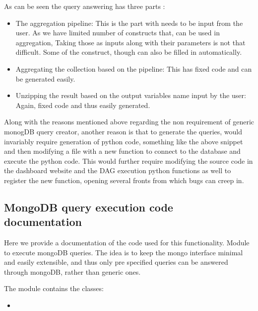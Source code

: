 \documentclass[letterpaper,10pt,english]{sphinxmanual}
\begin{document}
As can be seen the query answering has three parts :
\begin{itemize}
\item {} 
The aggregation pipeline: This is the part with needs to be input from the user. As we have limited number of constructs that, can be used in aggregation, Taking those as inputs along with their parameters is not that difficult. Some of the construct, though can also be filled in automatically.

\item {} 
Aggregating the collection based on the pipeline: This has fixed code and can be generated easily.

\item {} 
Unzipping the result based on the output variables name input by the user: Again, fixed code and thus easily generated.

\end{itemize}

Along with the reasons mentioned above regarding the non requirement of generic monogDB query creator, another reason is that to generate the queries, would invariably require generation of python code, something like the above snippet and then modifying a file with a new function to connect to the database and execute the python code. This would further require modifying the source code in the dashboard website and the DAG execution python functions as well to register the new function, opening several fronts from which bugs can creep in.


\subsection{MongoDB query execution code documentation}
\label{\detokenize{mongoDB_query_generation:mongodb-query-execution-code-documentation}}
Here we provide a documentation of the code used for this functionality.
\label{\detokenize{mongoDB_query_generation:module-execute_queries}}
Module to execute mongoDB queries. The idea is to keep the  mongo interface minimal and easily extensible, and thus
only pre specified queries can be answered through mongoDB, rather than generic ones.

The {\hyperref[\detokenize{mongoDB_query_generation:module-execute_queries}]{}} module contains the classes:
\begin{itemize}
\item {} 
{\hyperref[\detokenize{mongoDB_query_generation:execute_queries.MongoQuery}]{}}

\end{itemize}
\end{document}
